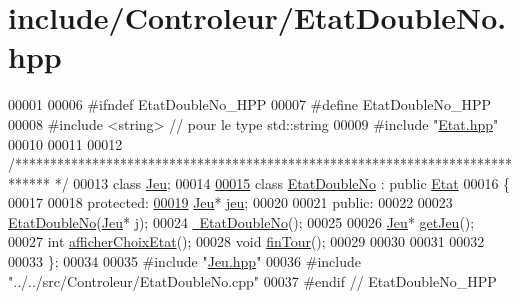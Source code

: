 \hypertarget{_etat_double_no_8hpp_source}{\section{include/\-Controleur/\-Etat\-Double\-No.hpp}
}

\begin{DoxyCode}
00001 
00006 \textcolor{preprocessor}{#ifndef EtatDoubleNo\_HPP}
00007 \textcolor{preprocessor}{}\textcolor{preprocessor}{#define EtatDoubleNo\_HPP}
00008 \textcolor{preprocessor}{}\textcolor{preprocessor}{#include <string>} \textcolor{comment}{// pour le type std::string}
00009 \textcolor{preprocessor}{#include "\hyperlink{_etat_8hpp}{Etat.hpp}"}
00010 
00011 
00012 \textcolor{comment}{/*****************************************************************************
      */}
00013 \textcolor{keyword}{class }\hyperlink{class_jeu}{Jeu};
00014 
\hypertarget{_etat_double_no_8hpp_source_l00015}{}\hyperlink{class_etat_double_no}{00015} \textcolor{keyword}{class }\hyperlink{class_etat_double_no}{EtatDoubleNo} : \textcolor{keyword}{public} \hyperlink{class_etat}{Etat}
00016 \{
00017 
00018     \textcolor{keyword}{protected}:
\hypertarget{_etat_double_no_8hpp_source_l00019}{}\hyperlink{class_etat_double_no_ac1166f725800d6a7f9c0c83bf6d7665e}{00019}         \hyperlink{class_jeu}{Jeu}* \hyperlink{class_etat_double_no_ac1166f725800d6a7f9c0c83bf6d7665e}{jeu};   
00020 
00021     \textcolor{keyword}{public}:
00022         
00023         \hyperlink{class_etat_double_no_ac89c20bba357b6fff0d3d8aeead6b894}{EtatDoubleNo}(\hyperlink{class_jeu}{Jeu}* j);
00024         \hyperlink{class_etat_double_no_a5833701f2f11e8902ceb31626076dd2e}{~EtatDoubleNo}();
00025 
00026         \hyperlink{class_jeu}{Jeu}* \hyperlink{class_etat_double_no_a51f05fabae25436634e3b8c1ecdf5aef}{getJeu}();
00027         \textcolor{keywordtype}{int} \hyperlink{class_etat_double_no_a01af5700d0b3bd927af0d65f95395256}{afficherChoixEtat}();
00028         \textcolor{keywordtype}{void} \hyperlink{class_etat_double_no_a888b25f87b975d3d92bfaa2cf9ce064d}{finTour}();
00029         
00030         
00031         
00032         
00033 \};
00034 
00035 \textcolor{preprocessor}{#include "\hyperlink{_jeu_8hpp}{Jeu.hpp}"}
00036 \textcolor{preprocessor}{#include "../../src/Controleur/EtatDoubleNo.cpp"}
00037 \textcolor{preprocessor}{#endif // EtatDoubleNo\_HPP      }
\end{DoxyCode}
